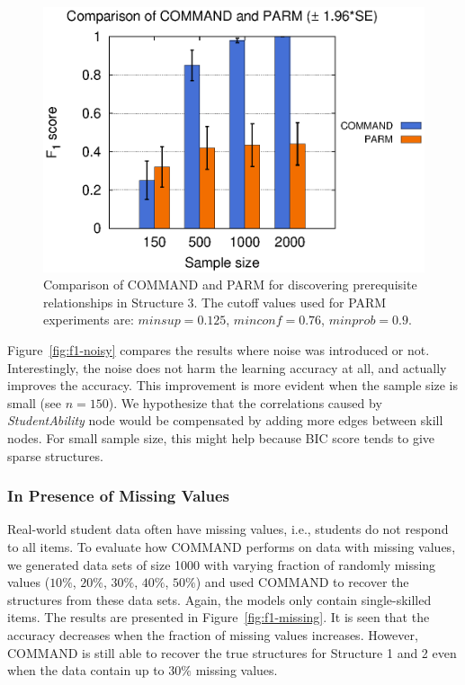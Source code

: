 \documentclass{edm_template}
\newcommand{\hl}[1]{\colorbox{yellow}{#1}}
\begin{document}
					\begin{figure}[!th]
						\begin{center}
							\centering
							\includegraphics[width=0.55\linewidth]{figures/F1_parm.eps}
						\end{center}
						\vspace{-1em}
						\caption{Comparison of COMMAND and PARM for discovering prerequisite relationships in Structure 3. The cutoff values used for PARM experiments are: $ minsup=0.125$, $minconf=0.76$, $minprob=0.9$.}
						\label{fig:f1-parm}
						\vspace{-1em} 
					\end{figure} 			
	
	Figure~\ref{fig:f1-noisy} compares the results where noise was introduced or not.
	Interestingly, the noise does not harm the learning accuracy at all, and actually improves the accuracy.
	This improvement is more evident when the sample size is small (see $n=150$).
	We hypothesize that the correlations caused by \emph{StudentAbility} node would be compensated by adding more edges between skill nodes. 
	For small sample size, this might help because BIC score tends to give sparse structures.

	
	\subsubsection{In Presence of Missing Values}
	Real-world student data often have missing values, i.e., students do not respond to all items. %
	To evaluate how COMMAND performs on data with missing values, we generated data sets of size 1000 with varying fraction of randomly missing values ($10\%$, $20\%$, $30\%$, $40\%$, $50\%$) and used COMMAND to recover the structures from these data sets. Again, the models only contain single-skilled items.  
	The results are presented in Figure~\ref{fig:f1-missing}.
	It is seen that the accuracy decreases when the fraction of missing values increases. 
	However, COMMAND is still able to recover the true structures for Structure 1 and 2 even when the data contain up to $30\%$ missing values. 
	
\end{document}
